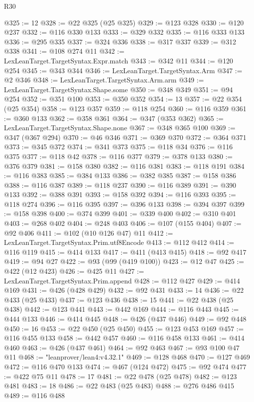 \begin{lexlean}{R30}
\begin{coremodule}
@325 := 12
@328 := @22 @325 (@25 @325)
@329 := @123 @328
@330 := @120 @237
@332 := @116 @330 @133
@333 := @329 @332
@335 := @116 @333 @133
@336 := @295 @335
@337 := @324 @336
@338 := @317 @337
@339 := @312 @338
@341 := @108 @274 @11
@342 := LexLeanTarget.TargetSyntax.Expr.match
@343 := @342 @11
@344 := @120 @254
@345 := @343 @344
@346 := LexLeanTarget.TargetSyntax.Arm
@347 := @2 @346
@348 := LexLeanTarget.TargetSyntax.Arm.arm
@349 := LexLeanTarget.TargetSyntax.Shape.some
@350 := @348 @349
@351 := @94 @254
@352 := @351 @100
@353 := @350 @352
@354 := 13
@357 := @22 @354 (@25 @354)
@358 := @123 @357
@359 := @118 @254
@360 := @116 @359
@361 := @360 @133
@362 := @358 @361
@364 := @347 (@353 @362)
@365 := LexLeanTarget.TargetSyntax.Shape.none
@367 := @348 @365 @100
@369 := @347 (@367 @294)
@370 := @46 @346
@371 := @369 @370
@372 := @364 @371
@373 := @345 @372
@374 := @341 @373
@375 := @118 @34
@376 := @116 @375
@377 := @118 @42
@378 := @116 @377
@379 := @378 @133
@380 := @376 @379
@381 := @158 @380
@382 := @116 @381
@383 := @118 @191
@384 := @116 @383
@385 := @384 @133
@386 := @382 @385
@387 := @158 @386
@388 := @116 @387
@389 := @118 @237
@390 := @116 @389
@391 := @390 @133
@392 := @388 @391
@393 := @158 @392
@394 := @116 @393
@395 := @118 @274
@396 := @116 @395
@397 := @396 @133
@398 := @394 @397
@399 := @158 @398
@400 := @374 @399
@401 := @339 @400
@402 := @310 @401
@403 := @268 @402
@404 := @248 @403
@406 := @107 (@155 @404)
@407 := @92 @406
@411 := @102 (@10 @126 @47) @11
@412 := LexLeanTarget.TargetSyntax.Prim.utf8Encode
@413 := @112 @412
@414 := @116 @119
@415 := @414 @133
@417 := @411 (@413 @415)
@418 := @92 @417
@419 := @94 @27
@422 := @93 (@99 (@419 @100))
@423 := @12 @47
@425 := @422 (@12 @423)
@426 := @425 @11
@427 := LexLeanTarget.TargetSyntax.Prim.append
@428 := @112 @427
@429 := @414 @169
@431 := @426 (@428 @429)
@432 := @92 @431
@433 := 14
@436 := @22 @433 (@25 @433)
@437 := @123 @436
@438 := 15
@441 := @22 @438 (@25 @438)
@442 := @123 @441
@443 := @442 @169
@444 := @116 @443
@445 := @444 @133
@446 := @414 @445
@448 := @426 (@437 @446)
@449 := @92 @448
@450 := 16
@453 := @22 @450 (@25 @450)
@455 := @123 @453 @169
@457 := @116 @455 @133
@458 := @442 @457
@460 := @116 @458 @133
@461 := @414 @460
@463 := @426 (@437 @461)
@464 := @92 @463
@467 := @93 @100 @47 @11
@468 := "leanprover/lean4:v4.32.1"
@469 := @128 @468
@470 := @127 @469
@472 := @116 @470 @133
@474 := @467 (@124 @472)
@475 := @92 @474
@477 := @422 @75 @11
@478 := 17
@481 := @22 @478 (@25 @478)
@482 := @123 @481
@483 := 18
@486 := @22 @483 (@25 @483)
@488 := @276 @486 @415
@489 := @116 @488

\end{coremodule}
\end{lexlean}
